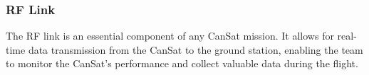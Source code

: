 \documentclass[11pt]{article}
\begin{document}
    

\subsubsection{RF Link}
The RF link is an essential component of any CanSat mission. It allows for real-time data transmission from the CanSat to the ground station, enabling the team to monitor the CanSat's performance and collect valuable data during the flight.
\end{document}
